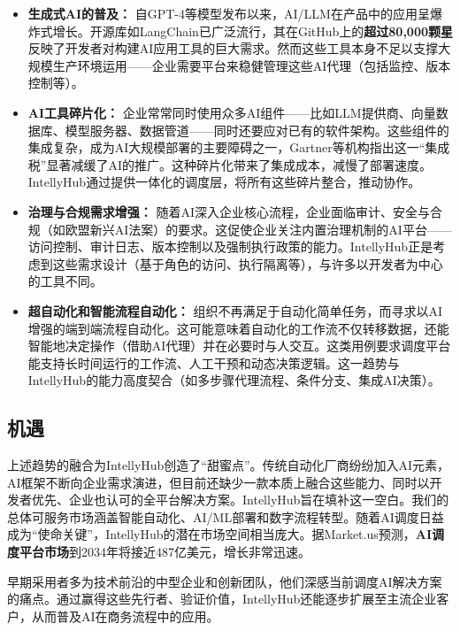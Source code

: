 \documentclass[11点, A4纸, 单面]{article}
\begin{document}
\begin{itemize}
    \item \textbf{生成式AI的普及：} 自GPT-4等模型发布以来，AI/LLM在产品中的应用呈爆炸式增长。开源库如LangChain已广泛流行，其在GitHub上的\textbf{超过80,000颗星}\cite{langchainGitHub}反映了开发者对构建AI应用工具的巨大需求。然而这些工具本身不足以支撑大规模生产环境运用——企业需要平台来稳健管理这些AI代理（包括监控、版本控制等）。 

    \item \textbf{AI工具碎片化：} 企业常常同时使用众多AI组件——比如LLM提供商、向量数据库、模型服务器、数据管道——同时还要应对已有的软件架构。这些组件的集成复杂，成为AI大规模部署的主要障碍之一，Gartner等机构指出这一“集成税”显著减缓了AI的推广\cite{gartnerAIBarriers}。这种碎片化带来了集成成本，减慢了部署速度。IntellyHub通过提供一体化的调度层，将所有这些碎片整合，推动协作。

    \item \textbf{治理与合规需求增强：} 随着AI深入企业核心流程，企业面临审计、安全与合规（如欧盟新兴AI法案\cite{euAIAct}）的要求。这促使企业关注内置治理机制的AI平台——访问控制、审计日志、版本控制以及强制执行政策的能力。IntellyHub正是考虑到这些需求设计（基于角色的访问、执行隔离等），与许多以开发者为中心的工具不同。

    \item \textbf{超自动化和智能流程自动化：} 组织不再满足于自动化简单任务，而寻求以AI增强的端到端流程自动化。这可能意味着自动化的工作流不仅转移数据，还能智能地决定操作（借助AI代理）并在必要时与人交互。这类用例要求调度平台能支持长时间运行的工作流、人工干预和动态决策逻辑。这一趋势与IntellyHub的能力高度契合（如多步骤代理流程、条件分支、集成AI决策）。
\end{itemize}

\subsection{机遇}
上述趋势的融合为IntellyHub创造了“甜蜜点”。传统自动化厂商纷纷加入AI元素，AI框架不断向企业需求演进，但目前还缺少一款本质上融合这些能力、同时以开发者优先、企业也认可的全平台解决方案。IntellyHub旨在填补这一空白。我们的总体可服务市场涵盖智能自动化、AI/ML部署和数字流程转型。随着AI调度日益成为“使命关键”，IntellyHub的潜在市场空间相当庞大。据Market.us预测，\textbf{AI调度平台市场}到2034年将接近487亿美元\cite{AIOrch}，增长非常迅速。

早期采用者多为技术前沿的中型企业和创新团队，他们深感当前调度AI解决方案的痛点。通过赢得这些先行者、验证价值，IntellyHub还能逐步扩展至主流企业客户，从而普及AI在商务流程中的应用。
\end{document}
